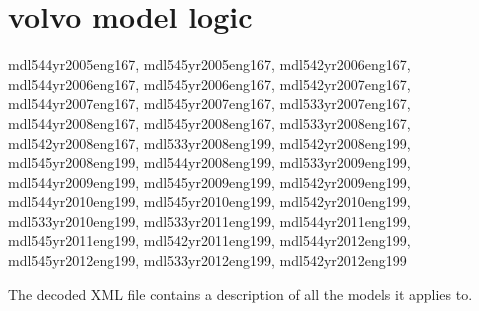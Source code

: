\documentclass[letterpaper,10pt,english]{sphinxmanual}
\begin{document}
\begin{sphinxVerbatim}[commandchars=\\\{\}]
          \PYG{p}{[}\PYG{p}{]}

          \PYG{p}{[}\PYG{p}{]}
            

\end{sphinxVerbatim}


\section{volvo model logic}
\label{\detokenize{decoding:volvo-model-logic}}
\sphinxAtStartPar
mdl544yr2005eng167, mdl545yr2005eng167, mdl542yr2006eng167, mdl544yr2006eng167, mdl545yr2006eng167, mdl542yr2007eng167, mdl544yr2007eng167, mdl545yr2007eng167, mdl533yr2007eng167, mdl544yr2008eng167, mdl545yr2008eng167, mdl533yr2008eng167, mdl542yr2008eng167, mdl533yr2008eng199, mdl542yr2008eng199, mdl545yr2008eng199, mdl544yr2008eng199, mdl533yr2009eng199, mdl544yr2009eng199, mdl545yr2009eng199, mdl542yr2009eng199, mdl544yr2010eng199, mdl545yr2010eng199, mdl542yr2010eng199, mdl533yr2010eng199, mdl533yr2011eng199, mdl544yr2011eng199, mdl545yr2011eng199, mdl542yr2011eng199, mdl544yr2012eng199, mdl545yr2012eng199, mdl533yr2012eng199, mdl542yr2012eng199

\sphinxAtStartPar
The decoded XML file contains a description of all the models it applies to.
\end{document}
